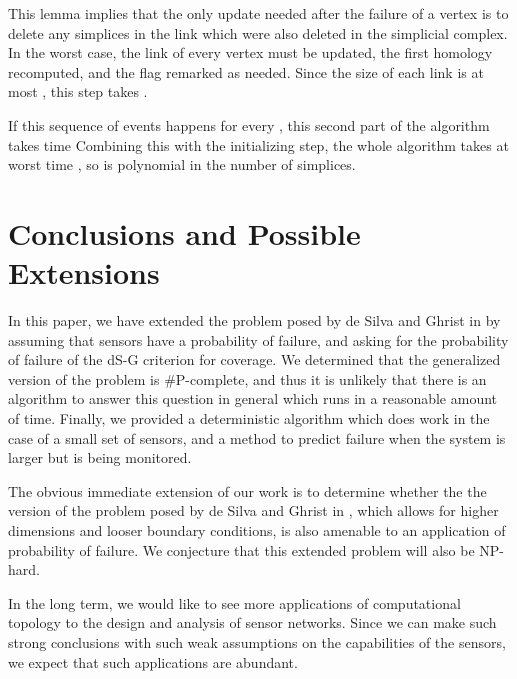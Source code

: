 \documentclass[10pt,twocolumn]{article} \usepackage{amsmath,epsf,amssymb,cite,pifont,amsthm, mathrsfs,epsfig,  bbm, amsthm,  setspace}
\renewcommand{\1}{\mathbbm{1}}
\begin{document}
This lemma implies that the only  update needed after the failure of a vertex is to delete any simplices in the link which were also deleted in the simplicial complex.
In the worst case, the link of every vertex must be updated, the first homology recomputed, and the flag remarked as needed.
Since the size of each link is at most , this step takes .

If this sequence of events happens for every , this second part of the algorithm takes time 
Combining this with the initializing step, the whole algorithm takes at worst time , so is polynomial in the number of simplices.





\section{Conclusions and Possible Extensions}\label{S: Conclusion}

In this paper, we have extended the problem posed by de Silva and Ghrist in \cite{DeSilva2006}
by assuming that  sensors have a probability of failure, and asking for the probability of failure of the dS-G criterion for
coverage.
We determined that the generalized version of the problem is \#P-complete, and thus it is unlikely that there is an
 algorithm to answer this question in general which runs in a reasonable amount of time.
Finally, we provided a deterministic algorithm which does work in the case of a small set of sensors,
and a method to predict failure when the system is larger but is being monitored.

The obvious immediate extension of our work is to determine whether the the version of the problem
posed by de Silva and Ghrist in \cite{DeSilva2007}, which allows for higher dimensions and looser
boundary conditions, is also amenable to an application of probability of failure.
We conjecture that this extended problem will also be NP-hard.

In the long term, we would like to see more applications of computational topology to the
design and analysis of sensor networks.
Since we can make such strong conclusions with such weak assumptions on the capabilities of the sensors,
we expect that such applications are abundant.



	
\end{document}

